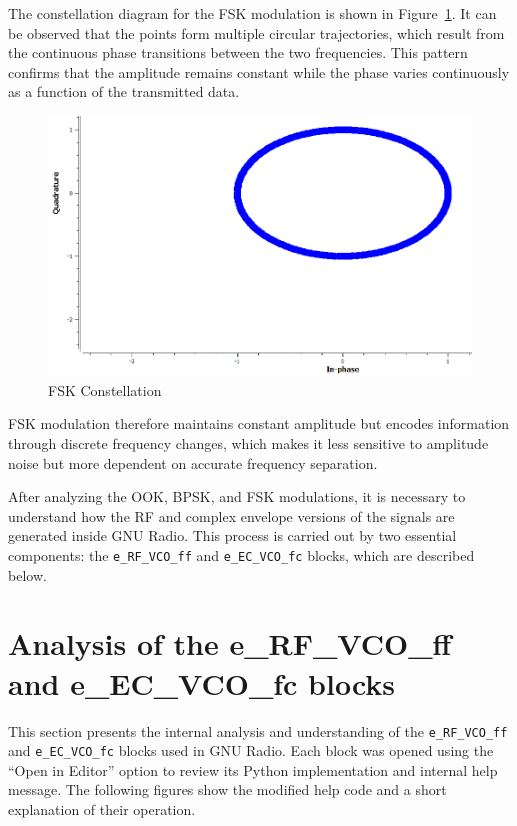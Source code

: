 \documentclass{journal}[IEEEtran, twocolumn]             %
\begin{document}
\begin{multicols}{2}
The constellation diagram for the FSK modulation is shown in Figure~\ref{fig:figFSKconstellation}. 
It can be observed that the points form multiple circular trajectories, 
which result from the continuous phase transitions between the two frequencies. 
This pattern confirms that the amplitude remains constant while the phase varies 
continuously as a function of the transmitted data.
\begin{figure}[H]
    \centering
        \centering
        \includegraphics[width=0.6\columnwidth]{figs/FSK_constelation.png}
    \caption{FSK Constellation}
    \label{fig:figFSKconstellation}
\end{figure}

FSK modulation therefore maintains constant amplitude but encodes information 
through discrete frequency changes, which makes it less sensitive to amplitude 
noise but more dependent on accurate frequency separation.


After analyzing the OOK, BPSK, and FSK modulations, it is necessary to understand how 
the RF and complex envelope versions of the signals are generated inside GNU Radio. 
This process is carried out by two essential components: the \texttt{e\_RF\_VCO\_ff} 
and \texttt{e\_EC\_VCO\_fc} blocks, which are described below.

\section{Analysis of the e\_RF\_VCO\_ff and e\_EC\_VCO\_fc blocks}

This section presents the internal analysis and understanding of the 
\texttt{e\_RF\_VCO\_ff} and \texttt{e\_EC\_VCO\_fc} blocks used in GNU Radio. 
Each block was opened using the ``Open in Editor'' option to review its Python 
implementation and internal help message. The following figures show the modified 
help code and a short explanation of their operation.


\end{multicols}
\end{document}
